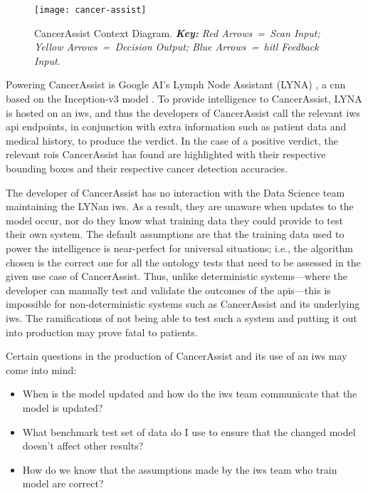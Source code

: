 \begin{figure}[th]
\centering
  \texttt{[image: cancer-assist]}
  \caption[CancerAssist Context Diagram]{CancerAssist Context Diagram. \textit{\textbf{Key:} Red Arrows~=~Scan Input; Yellow Arrows~=~Decision Output; Blue Arrows~=~\gls{hitl} Feedback Input.}}
  \label{fig:introduction:motivation:scenario:cancer}
\end{figure}

Powering CancerAssist is Google AI's Lymph Node Assistant (LYNA) \citep{Liu:2018fa}, a \gls{cnn} based on the Inception-v3 model \citep{Szegedy:2016ws,Krizhevsky:2012wl}. To provide intelligence to CancerAssist, LYNA is hosted on an \gls{iws}, and thus the developers of CancerAssist call the relevant \gls{iws} \gls{api} endpoints, in conjunction with extra information such as patient data and medical history, to produce the verdict. In the case of a positive verdict, the relevant \glspl{roi} CancerAssist has found are highlighted with their respective bounding boxes and their respective cancer detection accuracies.

The developer of CancerAssist has no interaction with the Data Science team maintaining the LYNan \gls{iws}. As a result, they are unaware when updates to the model occur, nor do they know what training data they could provide to test their own system. The default assumptions are that the training data used to power the intelligence is near-perfect for universal situations; i.e., the algorithm chosen is the correct one for all the ontology tests that need to be assessed in the given use case of CancerAssist. Thus, unlike deterministic systems---where the developer can manually test and validate the outcomes of the \glspl{api}---this is impossible for non-deterministic systems such as CancerAssist and its underlying \gls{iws}. The ramifications of not being able to test such a system and putting it out into production may prove fatal to patients.

Certain questions in the production of CancerAssist and its use of an \gls{iws} may come into mind:

\begin{itemize}
  \item When is the model updated and how do the \gls{iws} team communicate that the model is updated?
  \item What benchmark test set of data do I use to ensure that the changed model doesn't affect other results?
  \item How do we know that the assumptions made by the \gls{iws} team who train model are correct?
\end{itemize}

